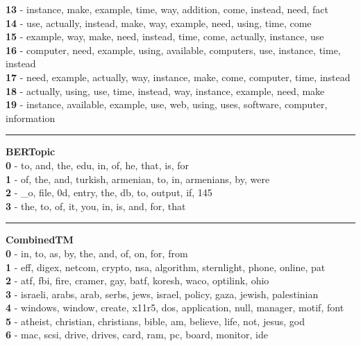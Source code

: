 \textbf{13} - instance, make, example, time, way, addition, come, instead, need, fact\\
\textbf{14} - use, actually, instead, make, way, example, need, using, time, come\\
\textbf{15} - example, way, make, need, instead, time, come, actually, instance, use\\
\textbf{16} - computer, need, example, using, available, computers, use, instance, time, instead\\
\textbf{17} - need, example, actually, way, instance, make, come, computer, time, instead\\
\textbf{18} - actually, using, use, time, instead, way, instance, example, need, make\\
\textbf{19} - instance, available, example, use, web, using, uses, software, computer, information\\
\hrule\vspace{2mm}
\noindent
\textbf{BERTopic}\vspace{2mm}\\
\vspace{2mm}
\noindent
\textbf{0} - to, and, the, edu, in, of, he, that, is, for\\
\textbf{1} - of, the, and, turkish, armenian, to, in, armenians, by, were\\
\textbf{2} - \_o, file, 0d, entry, the, db, to, output, if, 145\\
\textbf{3} - the, to, of, it, you, in, is, and, for, that\\
\hrule\vspace{2mm}
\noindent
\textbf{CombinedTM}\vspace{2mm}\\
\vspace{2mm}
\noindent
\textbf{0} - in, to, as, by, the, and, of, on, for, from\\
\textbf{1} - eff, digex, netcom, crypto, nsa, algorithm, sternlight, phone, online, pat\\
\textbf{2} - atf, fbi, fire, cramer, gay, batf, koresh, waco, optilink, ohio\\
\textbf{3} - israeli, arabs, arab, serbs, jews, israel, policy, gaza, jewish, palestinian\\
\textbf{4} - windows, window, create, x11r5, dos, application, null, manager, motif, font\\
\textbf{5} - atheist, christian, christians, bible, am, believe, life, not, jesus, god\\
\textbf{6} - mac, scsi, drive, drives, card, ram, pc, board, monitor, ide\\
